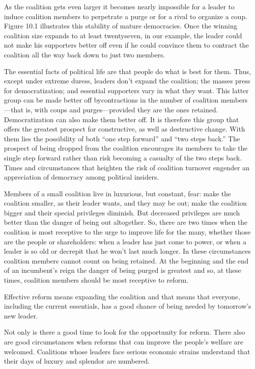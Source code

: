 \documentclass[10pt]{article}
\begin{document}
{\large As the coalition gets even larger it becomes nearly impossible for a
leader to induce coalition members to perpetrate a purge or for a rival to
organize a coup. Figure 10.1 illustrates this stability of mature democracies.
Once the winning coalition size expands to at least twentyseven, in our example,
the leader could not make his supporters better off even if he could convince
them to contract the coalition all the way back down to just two members.}

{\large The essential facts of political life are that people do what is best
for them. Thus, except under extreme duress, leaders don't expand the coalition;
the masses press for democratization; and essential supporters vary in what they
want. This latter group can be made better off bycontractions in the number of
coalition members---that is, with coups and purges---provided they are the ones
retained. Democratization can also make them better off. It is therefore this
group that offers the greatest prospect for constructive, as well as destructive
change. With them lies the possibility of both ``one step forward'' and ``two
steps back.'' The prospect of being dropped from the coalition encourages its
members to take the single step forward rather than risk becoming a casualty of
the two steps back. Times and circumstances that heighten the risk of coalition
turnover engender an appreciation of democracy among political insiders.}

{\large Members of a small coalition live in luxurious, but constant, fear: make
the coalition smaller, as their leader wants, and they may be out; make the
coalition bigger and their special privileges diminish. But decreased privileges
are much better than the danger of being out altogether. So, there are two times
when the coalition is most receptive to the urge to improve life for the many,
whether those are the people or shareholders: when a leader has just come to
power, or when a leader is so old or decrepit that he won't last much longer. In
these circumstances coalition members cannot count on being retained. At the
beginning and the end of an incumbent's reign the danger of being purged is
greatest and so, at these times, coalition members should be most receptive to
reform.}

{\large Effective reform means expanding the coalition and that means that
everyone, including the current essentials, has a good chance of being needed by
tomorrow's new leader.}

{\large Not only is there a good time to look for the opportunity for reform.
There also are good circumstances when reforms that can improve the people's
welfare are welcomed. Coalitions whose leaders face serious economic strains
understand that their days of luxury and splendor are numbered.}
\end{document}
